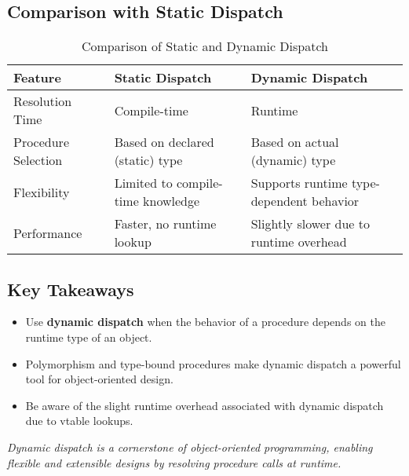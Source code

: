 \subsection{Comparison with Static Dispatch}

\begin{table}[htbp]
\centering
\begin{tabular}{l l l}
\hline
\textbf{Feature}        & \textbf{Static Dispatch}                & \textbf{Dynamic Dispatch}                \\ \hline
Resolution Time         & Compile-time                           & Runtime                                  \\
Procedure Selection     & Based on declared (static) type        & Based on actual (dynamic) type           \\
Flexibility             & Limited to compile-time knowledge      & Supports runtime type-dependent behavior \\
Performance             & Faster, no runtime lookup              & Slightly slower due to runtime overhead  \\ \hline
\end{tabular}
\caption{Comparison of Static and Dynamic Dispatch}
\label{tab:dispatch_comparison}
\end{table}

\subsection{Key Takeaways}
\begin{itemize}
    \item Use \textbf{dynamic dispatch} when the behavior of a procedure depends on the runtime type of an object.
    \item Polymorphism and type-bound procedures make dynamic dispatch a powerful tool for object-oriented design.
    \item Be aware of the slight runtime overhead associated with dynamic dispatch due to vtable lookups.
\end{itemize}

\begin{center}
\textit{Dynamic dispatch is a cornerstone of object-oriented programming, enabling flexible and extensible designs by resolving procedure calls at runtime.}
\end{center}


\endinput  %
